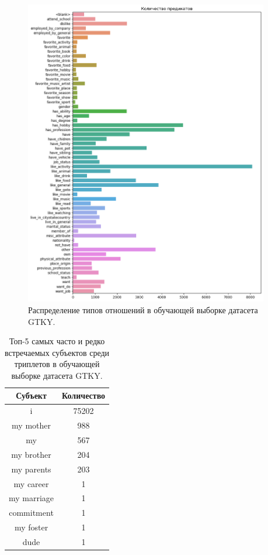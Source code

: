 \begin{figure}[!ht]
    \centering
    \includegraphics[width=0.95\textwidth]{images/predicate_distr.png}
    \caption{Распределение типов отношений в обучающей выборке датасета GTKY.}
    \label{fig:predicate_distr}
\end{figure}

\begin{table}[!ht]
\centering
\begin{tabular}{|c|c|}
    \hline
     Субъект & Количество \\
     \hline
    i & 75202 \\
    \hline
    my mother & 988 \\
    \hline
    my & 567 \\
    \hline
    my brother & 204 \\
    \hline
    my parents & 203 \\
    \hline
    \hline
    my career & 1 \\
    \hline
    my marriage & 1 \\
    \hline
    commitment & 1 \\
    \hline
    my foster & 1 \\
    \hline
    dude & 1 \\
    \hline
\end{tabular}
\caption{Топ-5 самых часто и редко встречаемых субъектов среди триплетов в обучающей выборке датасета GTKY.}
\label{table:top5_subj}
\end{table}

